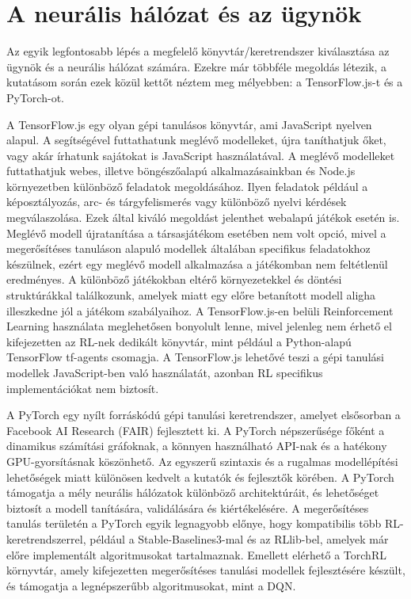\documentclass[
]{thesis-ekf}
\theoremstyle{definition}
\theoremstyle{remark}
\begin{document}
\section{A neurális hálózat és az ügynök}

Az egyik legfontosabb lépés a megfelelő könyvtár/keretrendszer kiválasztása az ügynök és a neurális hálózat számára. Ezekre már többféle megoldás létezik, a kutatásom során ezek közül kettőt néztem meg mélyebben: a TensorFlow.js-t és a PyTorch-ot.

A TensorFlow.js egy olyan gépi tanulásos könyvtár, ami JavaScript nyelven alapul. A segítségével futtathatunk meglévő modelleket, újra taníthatjuk őket, vagy akár írhatunk sajátokat is JavaScript használatával. A meglévő modelleket futtathatjuk webes, illetve böngészőalapú alkalmazásainkban és Node.js környezetben különböző feladatok megoldásához. Ilyen feladatok például a képosztályozás, arc- és tárgyfelismerés vagy különböző nyelvi kérdések megválaszolása. Ezek által kiváló megoldást jelenthet webalapú játékok esetén is. Meglévő modell újratanítása a társasjátékom esetében nem volt opció, mivel a megerősítéses tanuláson alapuló modellek általában specifikus feladatokhoz készülnek, ezért egy meglévő modell alkalmazása a játékomban nem feltétlenül eredményes. A különböző játékokban eltérő környezetekkel és döntési struktúrákkal találkozunk, amelyek miatt egy előre betanított modell aligha illeszkedne jól a játékom szabályaihoz. A TensorFlow.js-en belüli Reinforcement Learning használata meglehetősen bonyolult lenne, mivel jelenleg nem érhető el kifejezetten az RL-nek dedikált könyvtár, mint például a Python-alapú TensorFlow tf-agents csomagja. A TensorFlow.js lehetővé teszi a gépi tanulási modellek JavaScript-ben való használatát, azonban RL specifikus implementációkat nem biztosít. \cite{TFJS}

A PyTorch egy nyílt forráskódú gépi tanulási keretrendszer, amelyet elsősorban a Facebook AI Research (FAIR) fejlesztett ki. A PyTorch népszerűsége főként a dinamikus számítási gráfoknak, a könnyen használható API-nak és a hatékony GPU-gyorsításnak köszönhető. Az egyszerű szintaxis és a rugalmas modellépítési lehetőségek miatt különösen kedvelt a kutatók és fejlesztők körében. A PyTorch támogatja a mély neurális hálózatok különböző architektúráit, és lehetőséget biztosít a modell tanítására, validálására és kiértékelésére. A megerősítéses tanulás területén a PyTorch egyik legnagyobb előnye, hogy kompatibilis több RL-keretrendszerrel, például a Stable-Baselines3-mal és az RLlib-bel, amelyek már előre implementált algoritmusokat tartalmaznak. Emellett elérhető a TorchRL környvtár, amely kifejezetten megerősítéses tanulási modellek fejlesztésére készült, és támogatja a legnépszerűbb algoritmusokat, mint a DQN. \cite{PYTCH}
\end{document}
